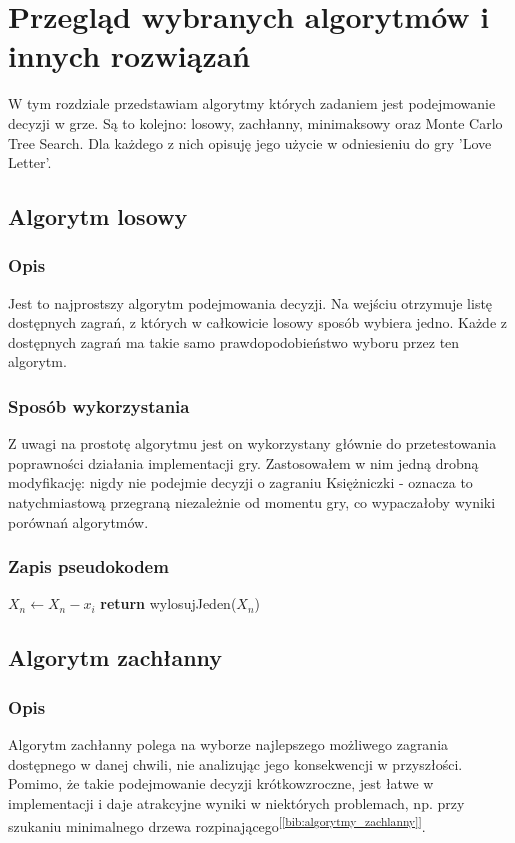 \chapter{Przegląd wybranych algorytmów i innych rozwiązań}
\label{cha:rozdz3}

W tym rozdziale przedstawiam algorytmy których zadaniem jest podejmowanie decyzji w grze. Są to kolejno: losowy, zachłanny, minimaksowy oraz Monte Carlo Tree Search. Dla każdego z nich opisuję jego użycie w odniesieniu do gry 'Love Letter'.

\section{Algorytm losowy}
\label{sec:algLos}
\subsection{Opis}
Jest to najprostszy algorytm podejmowania decyzji. Na wejściu otrzymuje listę dostępnych zagrań, z których w całkowicie losowy sposób wybiera jedno. Każde z dostępnych zagrań ma takie samo prawdopodobieństwo wyboru przez ten algorytm.

\subsection{Sposób wykorzystania}
Z uwagi na prostotę algorytmu jest on wykorzystany głównie do przetestowania poprawności działania implementacji gry. Zastosowałem w nim jedną drobną modyfikację: nigdy nie podejmie decyzji o zagraniu Księżniczki - oznacza to natychmiastową przegraną niezależnie od momentu gry, co wypaczałoby wyniki porównań algorytmów.

\subsection{Zapis pseudokodem}
\begin{algorithmic}[1]
				\State $X_n \gets X_n - x_i$
			\EndIf
		\EndFor
	\State \textbf{return} wylosujJeden($X_n$) 
	\EndFunction
\end{algorithmic}

\section{Algorytm zachłanny}
\label{sec:algZach}
\subsection{Opis}
Algorytm zachłanny polega na wyborze najlepszego możliwego zagrania dostępnego w danej chwili, nie analizując jego konsekwencji w przyszłości. Pomimo, że takie podejmowanie decyzji krótkowzroczne, jest łatwe w implementacji i daje atrakcyjne wyniki w niektórych problemach, np. przy szukaniu minimalnego drzewa rozpinającego\textsuperscript{[\ref{bib:algorytmy_zachlanny}]}.

